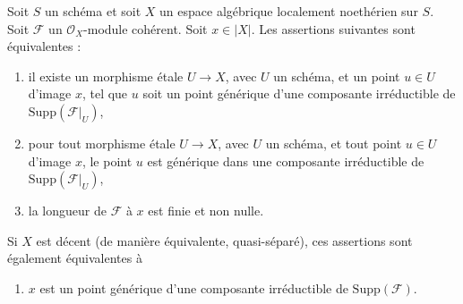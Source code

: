 \begin{lemma}
\label{lemma-length-finite}
Soit $S$ un schéma et soit $X$ un espace algébrique localement noethérien sur
$S$. Soit $\mathcal{F}$ un $\mathcal{O}_X$-module cohérent. Soit $x \in |X|$.
Les assertions suivantes sont équivalentes :
\begin{enumerate}
\item il existe un morphisme \'etale $U \to X$, avec $U$ un schéma, et un point
$u \in U$ d'image $x$, tel que $u$ soit un point générique d'une composante
irréductible de $\text{Supp}(\mathcal{F}|_U)$,
\item pour tout morphisme \'etale $U \to X$, avec $U$ un schéma, et tout point
$u \in U$ d'image $x$, le point $u$ est générique dans une composante irréductible
de $\text{Supp}(\mathcal{F}|_U)$,
\item la longueur de $\mathcal{F}$ à $x$ est finie et non nulle.
\end{enumerate}
Si $X$ est décent (de manière équivalente, quasi-séparé), ces assertions sont
également équivalentes à
\begin{enumerate}
\item[(4)] $x$ est un point générique d'une composante irréductible de
$\text{Supp}(\mathcal{F})$.
\end{enumerate}
\end{lemma}

